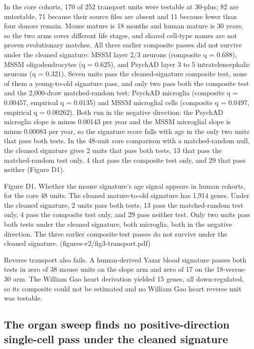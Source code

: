 \documentclass[11pt]{article}
\begin{document}
In the core cohorts, 170 of 252 transport units were testable at 30-plus; 82 are untestable, 71 because their source files are absent and 11 because fewer than four donors remain. Mouse mature is 18 months and human mature is 30 years, so the two arms cover different life stages, and shared cell-type names are not proven evolutionary matches. All three earlier composite passes did not survive under the cleaned signature: MSSM layer 2/3 neurons (composite q = 0.688), MSSM oligodendrocytes (q = 0.625), and PsychAD layer 3 to 5 intratelencephalic neurons (q = 0.321). Seven units pass the cleaned-signature composite test, none of them a young-to-old signature pass, and only two pass both the composite test and the 2,000-draw matched-random test: PsychAD microglia (composite q = 0.00457, empirical q = 0.0135) and MSSM microglial cells (composite q = 0.0497, empirical q = 0.00262). Both run in the negative direction: the PsychAD microglia slope is minus 0.00143 per year and the MSSM microglial slope is minus 0.00083 per year, so the signature score falls with age in the only two units that pass both tests. In the 48-unit core comparison with a matched-random null, the cleaned signature gives 2 units that pass both tests, 13 that pass the matched-random test only, 4 that pass the composite test only, and 29 that pass neither (Figure D1).

Figure D1. Whether the mouse signature's age signal appears in human cohorts, for the core 48 units. The cleaned mature-to-old signature has 1,914 genes. Under the cleaned signature, 2 units pass both tests, 13 pass the matched-random test only, 4 pass the composite test only, and 29 pass neither test. Only two units pass both tests under the cleaned signature, both microglia, both in the negative direction. The three earlier composite-test passes do not survive under the cleaned signature. (figures-v2/fig3-transport.pdf)

Reverse transport also fails. A human-derived Yazar blood signature passes both tests in zero of 38 mouse units on the slope arm and zero of 17 on the 18-versus-30 arm. The William Gao heart derivation yielded 15 genes, all down-regulated, so its composite could not be estimated and no William Gao heart reverse unit was testable.

\subsection*{The organ sweep finds no positive-direction single-cell pass under the cleaned signature}
\end{document}
